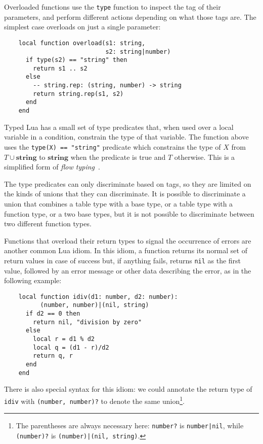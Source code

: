 \documentclass[preprint]{sig-alternate}
\newcommand{\String}{\mathbf{string}}
\begin{document}
Overloaded functions use the {\tt type} function to inspect
the tag of their parameters, and perform different actions
depending on what those tags are. The simplest case overloads
on just a single parameter:

\begin{verbatim}
    local function overload(s1: string, 
                            s2: string|number)
      if type(s2) == "string" then
        return s1 .. s2
      else
        -- string.rep: (string, number) -> string
        return string.rep(s1, s2)
      end
    end
\end{verbatim}

Typed Lua has a small set of type predicates that, when used
over a local variable in a condition, constrain the type of that
variable. The function above uses the {\tt type(X) == "string"}
predicate which constrains the type of $X$ from $T \cup \String$ to
$\String$ when the predicate is true and $T$ otherwise. This is
a simplified form of {\em flow typing}~\cite{guha:flow}.

The type predicates can only discriminate based on tags, so they
are limited on the kinds of unions that they can discriminate. It
is possible to discriminate a union that combines a table type with
a base type, or a table type with a function type, or a two base types,
but it is not possible to discriminate between two different function
types.

Functions that overload their return types to signal the occurrence
of errors are another common Lua idiom. In this idiom, a function
returns its normal set of return values in case of success but,
if anything fails, returns {\tt nil} as the first value, followed
by an error message or other data describing the error, as in the
following example:

\begin{verbatim}
    local function idiv(d1: number, d2: number):
          (number, number)|(nil, string)
      if d2 == 0 then
        return nil, "division by zero"
      else
        local r = d1 % d2
        local q = (d1 - r)/d2
        return q, r
      end
    end
\end{verbatim}

There is also special syntax for this idiom: we could
annotate the return type of {\tt idiv} with {\tt (number, number)?}
to denote the same union\footnote{The parentheses are always
necessary here: {\tt number?} is {\tt number|nil}, while {\tt (number)?}
is {\tt (number)|(nil, string)}.}. 
\end{document}

